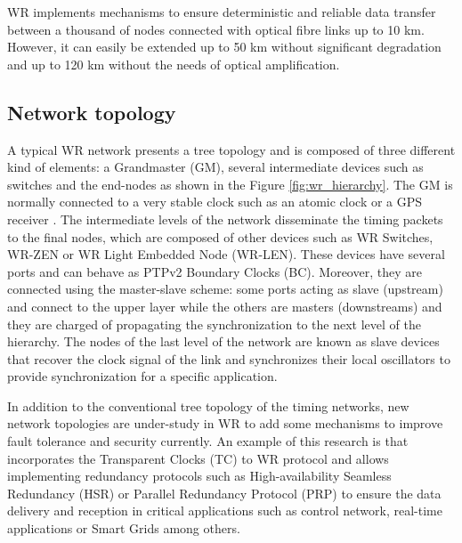 WR implements mechanisms to ensure deterministic and reliable data transfer 
between a thousand of nodes connected with  optical fibre links up to 10 km. 
However, it can easily be extended up to 50 km without significant degradation 
and up to 120 km without the needs of optical amplification. 

\subsection{Network topology} 
\label{subsec:wr-net}

A typical WR network presents a tree topology and is composed of three different kind of elements: a Grandmaster (GM), several intermediate devices such as switches and the end-nodes as shown in the Figure \ref{fig:wr_hierarchy}. The GM is normally connected to a very stable clock such as an atomic clock or a GPS receiver \cite{Daniluk2012}. The intermediate levels of the network disseminate the timing packets to the final nodes, which are composed of other devices such as WR Switches, WR-ZEN or WR Light Embedded Node (WR-LEN). These devices have several ports and can behave as PTPv2 Boundary Clocks (BC). Moreover, they are connected using the master-slave scheme: some ports acting as slave (upstream) and connect to the upper layer while the others are masters (downstreams) and they are charged of propagating the synchronization to the next level of the hierarchy. The nodes of the last level of the network are known as slave devices that recover the clock signal of the link and synchronizes their local oscillators to provide synchronization for a specific application.

In addition to the conventional tree topology of the timing networks, new network topologies are under-study in WR to add some mechanisms to improve fault tolerance and security currently. An example of this research is \cite{jlgutierrez-paper-redundancy} that incorporates the Transparent Clocks (TC) to WR protocol and allows implementing redundancy protocols such as High-availability Seamless Redundancy (HSR) or Parallel Redundancy Protocol (PRP) to ensure the data delivery and reception in critical applications such as control network, real-time applications or Smart Grids among others.

